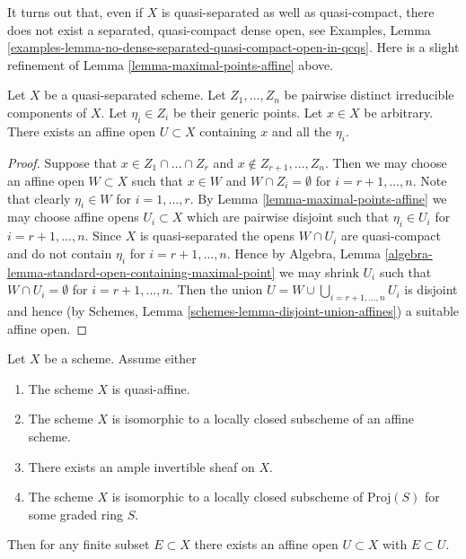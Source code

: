 \noindent
It turns out that, even if $X$ is quasi-separated as well as quasi-compact,
there does not exist a separated, quasi-compact dense open, see
Examples, Lemma
\ref{examples-lemma-no-dense-separated-quasi-compact-open-in-qcqs}.
Here is a slight refinement of Lemma \ref{lemma-maximal-points-affine} above.

\begin{lemma}
\label{lemma-point-and-maximal-points-affine}
Let $X$ be a quasi-separated scheme. Let $Z_1, \ldots, Z_n$ be pairwise
distinct irreducible components of $X$. Let $\eta_i \in Z_i$ be their
generic points. Let $x \in X$ be arbitrary.
There exists an affine open $U \subset X$ containing
$x$ and all the $\eta_i$.
\end{lemma}

\begin{proof}
Suppose that $x \in Z_1 \cap \ldots \cap Z_r$ and
$x \not \in Z_{r + 1}, \ldots, Z_n$. Then we may choose
an affine open $W \subset X$ such that
$x \in W$ and $W \cap Z_i = \emptyset$ for
$i = r + 1, \ldots, n$. Note that clearly $\eta_i \in W$
for $i = 1, \ldots, r$. By Lemma \ref{lemma-maximal-points-affine}
we may choose affine opens $U_i \subset X$ which are pairwise
disjoint such that $\eta_i \in U_i$ for $i = r + 1, \ldots, n$.
Since $X$ is quasi-separated the opens $W \cap U_i$
are quasi-compact and do not contain $\eta_i$ for
$i = r + 1, \ldots, n$. Hence by
Algebra, Lemma \ref{algebra-lemma-standard-open-containing-maximal-point}
we may shrink $U_i$ such that $W \cap U_i = \emptyset$
for $i = r + 1, \ldots, n$. Then the union
$U = W \cup \bigcup_{i = r + 1, \ldots, n} U_i$ is disjoint and hence
(by Schemes, Lemma \ref{schemes-lemma-disjoint-union-affines})
a suitable affine open.
\end{proof}

\begin{lemma}
\label{lemma-ample-finite-set-in-affine}
Let $X$ be a scheme. Assume either
\begin{enumerate}
\item The scheme $X$ is quasi-affine.
\item The scheme $X$ is isomorphic to a locally closed subscheme
of an affine scheme.
\item There exists an ample invertible sheaf on $X$.
\item The scheme $X$ is isomorphic to a locally closed subscheme
of $\text{Proj}(S)$ for some graded ring $S$.
\end{enumerate}
Then for any finite subset $E \subset X$ there exists an
affine open $U \subset X$ with $E \subset U$.
\end{lemma}

